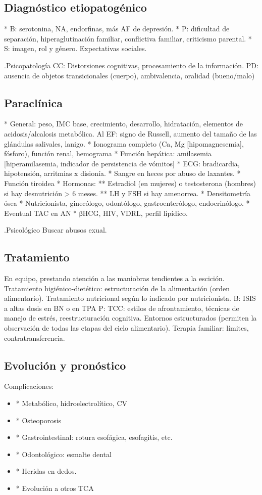 \subsection*{Diagnóstico etiopatogénico}
* B: serotonina, NA, endorfinas, más AF de depresión.
* P: dificultad de separación, hiperaglutinación familiar, conflictiva familiar, criticismo parental.
* S: imagen, rol y género. Expectativas sociales.

.Psicopatología
CC: Distorsiones cognitivas, procesamiento de la información.
PD: ausencia de objetos transicionales (cuerpo), ambivalencia, oralidad (bueno/malo)

\subsection*{Paraclínica}
* General: peso, IMC base, crecimiento, desarrollo, hidratación, elementos de acidosis/alcalosis metabólica. Al EF: signo de Russell, aumento del tamaño de las glándulas salivales, lanigo.
* Ionograma completo (Ca, Mg [hipomagnesemia], fósforo), función renal, hemograma
* Función hepática: amilasemia [hiperamilasemia, indicador de persistencia de vómitos]
* ECG: bradicardia, hipotensión, arritmias x disionía.
* Sangre en heces por abuso de laxantes.
* Función tiroidea
* Hormonas:
** Estradiol (en mujeres) o testosterona (hombres) si hay desnutrición > 6 meses.
** LH y FSH si hay amenorrea.
* Densitometría ósea
* Nutricionista, ginecólogo, odontólogo, gastroenterólogo, endocrinólogo.
* Eventual TAC en AN
* βHCG, HIV, VDRL, perfil lipídico.

.Psicológico
Buscar abusos exual.

\subsection*{Tratamiento}
En equipo, prestando atención a las maniobras tendientes a la escición.
Tratamiento higiénico-dietético: estructuración de la alimentación (orden alimentario).
Tratamiento nutricional según lo indicado por nutricionista.
B: ISIS a altas dosis en BN o en TPA
P: TCC: estilos de afrontamiento, técnicas de manejo de estrés, reestructuración cognitiva. Entornos estructurados (permiten la observación de todas las etapas del ciclo alimentario). Terapia familiar: límites, contratransferencia.

\subsection*{Evolución y pronóstico}
Complicaciones:
\begin{itemize}
	\item * Metabólico, hidroelectrolítico, CV
	\item * Osteoporosis
	\item * Gastrointestinal: rotura esofágica, esofagitis, etc.
	\item * Odontológico: esmalte dental
	\item * Heridas en dedos.
	\item * Evolución a otros TCA
\end{itemize}
\printbibliography
